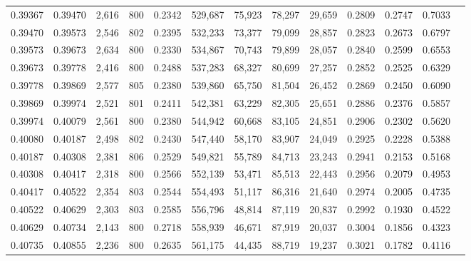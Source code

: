 \begin{tabular}{rrrrrrrrrrrrr}
0.39367 & 0.39470 &  2,616 & 800 &                                     0.2342 & 529,687 &  75,923 &  78,297 &  29,659 & 0.2809 & 0.2747 & 0.7033 \\
0.39470 & 0.39573 &  2,546 & 802 &                                     0.2395 & 532,233 &  73,377 &  79,099 &  28,857 & 0.2823 & 0.2673 & 0.6797 \\
0.39573 & 0.39673 &  2,634 & 800 &                                     0.2330 & 534,867 &  70,743 &  79,899 &  28,057 & 0.2840 & 0.2599 & 0.6553 \\
0.39673 & 0.39778 &  2,416 & 800 &                                     0.2488 & 537,283 &  68,327 &  80,699 &  27,257 & 0.2852 & 0.2525 & 0.6329 \\
0.39778 & 0.39869 &  2,577 & 805 &                                     0.2380 & 539,860 &  65,750 &  81,504 &  26,452 & 0.2869 & 0.2450 & 0.6090 \\
0.39869 & 0.39974 &  2,521 & 801 &                                     0.2411 & 542,381 &  63,229 &  82,305 &  25,651 & 0.2886 & 0.2376 & 0.5857 \\
0.39974 & 0.40079 &  2,561 & 800 &                                     0.2380 & 544,942 &  60,668 &  83,105 &  24,851 & 0.2906 & 0.2302 & 0.5620 \\
0.40080 & 0.40187 &  2,498 & 802 &                                     0.2430 & 547,440 &  58,170 &  83,907 &  24,049 & 0.2925 & 0.2228 & 0.5388 \\
0.40187 & 0.40308 &  2,381 & 806 &                                     0.2529 & 549,821 &  55,789 &  84,713 &  23,243 & 0.2941 & 0.2153 & 0.5168 \\
0.40308 & 0.40417 &  2,318 & 800 &                                     0.2566 & 552,139 &  53,471 &  85,513 &  22,443 & 0.2956 & 0.2079 & 0.4953 \\
0.40417 & 0.40522 &  2,354 & 803 &                                     0.2544 & 554,493 &  51,117 &  86,316 &  21,640 & 0.2974 & 0.2005 & 0.4735 \\
0.40522 & 0.40629 &  2,303 & 803 &                                     0.2585 & 556,796 &  48,814 &  87,119 &  20,837 & 0.2992 & 0.1930 & 0.4522 \\
0.40629 & 0.40734 &  2,143 & 800 &                                     0.2718 & 558,939 &  46,671 &  87,919 &  20,037 & 0.3004 & 0.1856 & 0.4323 \\
0.40735 & 0.40855 &  2,236 & 800 &                                     0.2635 & 561,175 &  44,435 &  88,719 &  19,237 & 0.3021 & 0.1782 & 0.4116 \\

\end{tabular}
